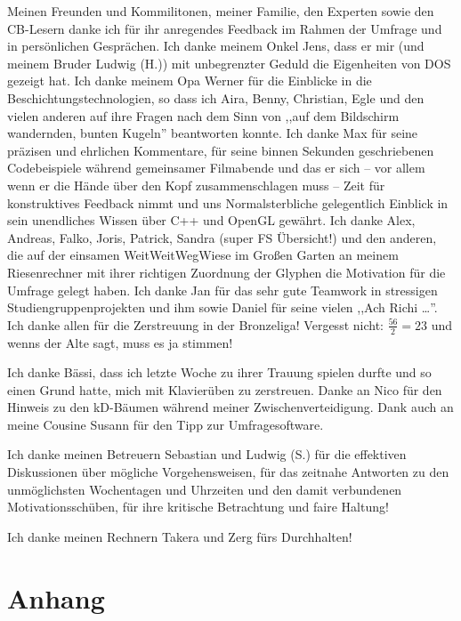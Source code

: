 Meinen Freunden und Kommilitonen, meiner Familie, den Experten sowie den CB-Lesern danke ich für ihr anregendes Feedback im Rahmen der Umfrage und in persönlichen Gesprächen. Ich danke meinem Onkel Jens, dass er mir (und meinem Bruder Ludwig (H.)) mit unbegrenzter Geduld die Eigenheiten von DOS gezeigt hat. Ich danke meinem Opa Werner für die Einblicke in die Beschichtungstechnologien, so dass ich Aira, Benny, Christian, Egle und den vielen anderen auf ihre Fragen nach dem Sinn von ,,auf dem Bildschirm wandernden, bunten Kugeln'' beantworten konnte. Ich danke Max für seine präzisen und ehrlichen Kommentare, für seine binnen Sekunden geschriebenen Codebeispiele während gemeinsamer Filmabende und das er sich -- vor allem wenn er die Hände über den Kopf zusammenschlagen muss -- Zeit für konstruktives Feedback nimmt und uns Normalsterbliche gelegentlich Einblick in sein unendliches Wissen über C++ und OpenGL gewährt. Ich danke Alex, Andreas, Falko, Joris, Patrick, Sandra (super FS Übersicht!) und den anderen, die auf der einsamen WeitWeitWegWiese im Großen Garten an meinem Riesenrechner mit ihrer richtigen Zuordnung der Glyphen die Motivation für die Umfrage gelegt haben. Ich danke Jan für das sehr gute Teamwork in stressigen Studiengruppenprojekten und ihm sowie Daniel für seine vielen ,,Ach Richi \ldots''. Ich danke allen für die Zerstreuung in der Bronzeliga! Vergesst nicht: $\frac{56}2 = 23$ und wenns der Alte sagt, muss es ja stimmen!

Ich danke Bässi, dass ich letzte Woche zu ihrer Trauung spielen durfte und so einen Grund hatte, mich mit Klavierüben zu zerstreuen. Danke an Nico für den Hinweis zu den kD-Bäumen während meiner Zwischenverteidigung. Dank auch an meine Cousine Susann für den Tipp zur Umfragesoftware.

Ich danke meinen Betreuern Sebastian und Ludwig (S.) für die effektiven Diskussionen über mögliche Vorgehensweisen, für das zeitnahe Antworten zu den unmöglichsten Wochentagen und Uhrzeiten und den damit verbundenen Motivationsschüben, für ihre kritische Betrachtung und faire Haltung!

Ich danke meinen Rechnern Takera und Zerg fürs Durchhalten!



\appendix

\chapter{Anhang}

